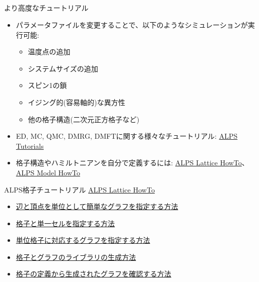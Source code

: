 \subsection*{\redb\whiteb\greenb}

\begin{frame}[t,fragile]{より高度なチュートリアル}
  \begin{itemize}
  \item パラメータファイルを変更することで、以下のようなシミュレーションが実行可能:
    \begin{itemize}
    \item 温度点の追加
    \item システムサイズの追加
    \item スピン1の鎖
    \item イジング的(容易軸的)な異方性
    \item 他の格子構造(二次元正方格子など)
    \end{itemize}
  \item ED, MC, QMC, DMRG, DMFTに関する様々なチュートリアル: \href{http://alps.comp-phys.org/mediawiki/index.php/ALPS_2_Tutorials:Overview}{ALPS Tutorials}
  \item 格子構造やハミルトニアンを自分で定義するには: \href{http://alps.comp-phys.org/mediawiki/index.php/Tutorials:LatticeHOWTO}{ALPS Lattice HowTo}、\href{http://alps.comp-phys.org/mediawiki/index.php/Tutorials:ModelHOWTO}{ALPS Model HowTo}
  \end{itemize}
\end{frame}

\begin{frame}[t,fragile]{ALPS格子チュートリアル}
  \href{http://alps.comp-phys.org/mediawiki/index.php/Tutorials:LatticeHOWTO/ja}{ALPS Lattice HowTo} \\
  \begin{itemize}
    \item \href{http://alps.comp-phys.org/mediawiki/index.php/Tutorials:LatticeHOWTO:SimpleGraphs/ja}{辺と頂点を単位として簡単なグラフを指定する方法}
    \item \href{http://alps.comp-phys.org/mediawiki/index.php/Tutorials:LatticesAndUnitCells/ja}{格子と単一セルを指定する方法}
    \item \href{http://alps.comp-phys.org/mediawiki/index.php/Tutorials:LatticesAndGraphs/ja}{単位格子に対応するグラフを指定する方法}
    \item \href{http://alps.comp-phys.org/mediawiki/index.php/Tutorials:LatticeHOWTO:Library/ja}{格子とグラフのライブラリの生成方法}
    \item \href{http://alps.comp-phys.org/mediawiki/index.php/Tutorials:LatticeHowto:CheckLattice/ja}{格子の定義から生成されたグラフを確認する方法}
  \end{itemize}
\end{frame}

